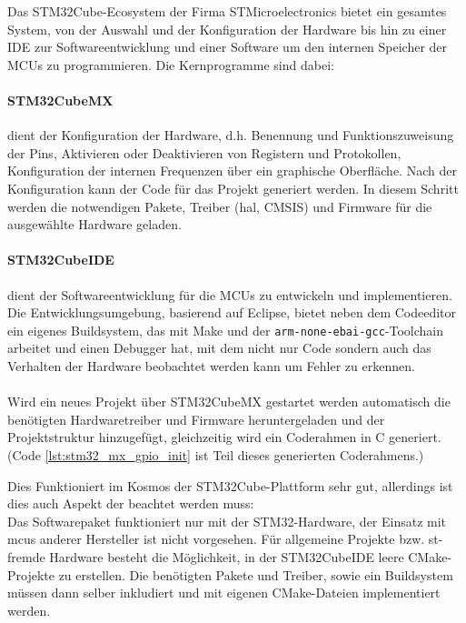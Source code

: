 Das STM32Cube-Ecosystem \cite{stm32cube_ecosystem} der Firma STMicroelectronics bietet ein gesamtes System, von der Auswahl und der Konfiguration der Hardware bis hin zu einer IDE zur Softwareentwicklung und einer Software um den internen Speicher der MCUs zu programmieren.
Die Kernprogramme sind dabei:

\paragraph{STM32CubeMX} 
	dient der Konfiguration der Hardware, d.h. Benennung und Funktionszuweisung der Pins, Aktivieren oder Deaktivieren von Registern und Protokollen, Konfiguration der internen Frequenzen über ein graphische Oberfläche.
	Nach der Konfiguration kann der Code für das Projekt generiert werden.
	In diesem Schritt werden die notwendigen Pakete, Treiber (\gls{hal}, CMSIS) und Firmware für die ausgewählte Hardware geladen. \cite{stm32cubemx}

\paragraph{STM32CubeIDE}
	dient der Softwareentwicklung für die MCUs zu entwickeln und implementieren.
	Die Entwicklungsumgebung, basierend auf Eclipse, bietet neben dem Codeeditor ein eigenes Buildsystem, das mit Make und der \texttt{arm-none-ebai-gcc}-Toolchain arbeitet und einen Debugger hat, mit dem nicht nur Code sondern auch das Verhalten der Hardware beobachtet werden kann um Fehler zu erkennen. \cite{stm32cubeide}
\\
\\
Wird ein neues Projekt über STM32CubeMX gestartet werden automatisch die benötigten Hardwaretreiber und Firmware heruntergeladen und der Projektstruktur hinzugefügt, gleichzeitig wird ein Coderahmen in C generiert. (Code \ref{lst:stm32_mx_gpio_init} ist Teil dieses generierten Coderahmens.)

Dies Funktioniert im Kosmos der STM32Cube-Plattform sehr gut, allerdings ist dies auch Aspekt der beachtet werden muss:\\
Das Softwarepaket funktioniert nur mit der STM32-Hardware, der Einsatz mit \gls{mcu}s anderer Hersteller ist nicht vorgesehen.
Für allgemeine Projekte bzw. st-fremde Hardware besteht die Möglichkeit, in der STM32CubeIDE leere CMake-Projekte zu erstellen.
Die benötigten Pakete und Treiber, sowie ein Buildsystem müssen dann selber inkludiert und mit eigenen CMake-Dateien implementiert werden.


